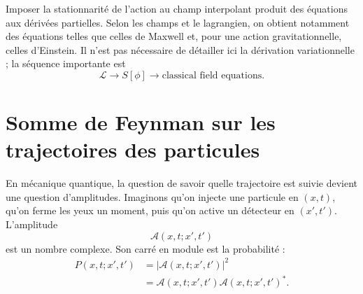 \begin{classroomqa}
\end{classroomqa}

\begin{classroomqa}
\end{classroomqa}

Imposer la stationnarité de l’action au champ interpolant produit des équations aux dérivées partielles. Selon les champs et le lagrangien, on obtient notamment des équations telles que celles de Maxwell et, pour une action gravitationnelle, celles d’Einstein. Il n’est pas nécessaire de détailler ici la dérivation variationnelle ; la séquence importante est
\begin{equation}
\mathcal{L}
\longrightarrow
S[\phi]
\longrightarrow
\text{classical field equations}.
\end{equation}

\section{Somme de Feynman sur les trajectoires des particules}

En mécanique quantique, la question de savoir quelle trajectoire est suivie devient une question d’amplitudes. Imaginons qu’on injecte une particule en \((x,t)\), qu’on ferme les yeux un moment, puis qu’on active un détecteur en \((x',t')\). L’amplitude
\begin{equation}
\mathcal{A}(x,t;x',t')
\end{equation}
est un nombre complexe. Son carré en module est la probabilité :
\begin{equation}
\begin{aligned}
P(x,t;x',t')
&=\left|\mathcal{A}(x,t;x',t')\right|^2\\
&=\mathcal{A}(x,t;x',t')
\mathcal{A}(x,t;x',t')^*.
\end{aligned}
\end{equation}


